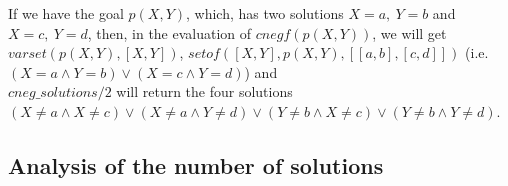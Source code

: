 \documentclass{llncs}
\newcommand{\entails}{\models}
\newcommand{\vecy}{\overline{y}}
\begin{document}
If we have the goal $p(X,Y)$, which, has two solutions $X=a,~Y=b$ and
$X=c,~Y=d$, then, in the evaluation of $cnegf(p(X,Y))$, we will get
$varset(p(X,Y),[X,Y])$, $setof([X,Y],p(X,Y),[[a,b],[c,d]])$
(i.e. $(X=a \wedge Y=b) \vee (X=c \wedge Y=d)$) and \\$cneg\_solutions/2$
will return the four solutions $(X \neq a \wedge X \neq c) \vee (X
\neq a \wedge Y \neq d) \vee (Y \neq b \wedge X \neq c) \vee (Y \neq b
\wedge Y \neq d)$.









\subsection{Analysis of the number of solutions}
\label{cneg:finite_analysis}
\end{document}
